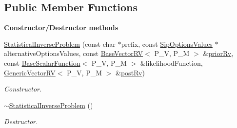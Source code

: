 \subsection*{Public Member Functions}
\begin{Indent}{\bf Constructor/\-Destructor methods}\par
\begin{DoxyCompactItemize}
\item 
\hyperlink{class_q_u_e_s_o_1_1_statistical_inverse_problem_a98ad98a7030b2c6577a0e840506bf74d}{Statistical\-Inverse\-Problem} (const char $\ast$prefix, const \hyperlink{class_q_u_e_s_o_1_1_sip_options_values}{Sip\-Options\-Values} $\ast$alternative\-Options\-Values, const \hyperlink{class_q_u_e_s_o_1_1_base_vector_r_v}{Base\-Vector\-R\-V}$<$ P\-\_\-\-V, P\-\_\-\-M $>$ \&\hyperlink{class_q_u_e_s_o_1_1_statistical_inverse_problem_a954df0672a7c1271eaff53b8d5f3fbc2}{prior\-Rv}, const \hyperlink{class_q_u_e_s_o_1_1_base_scalar_function}{Base\-Scalar\-Function}$<$ P\-\_\-\-V, P\-\_\-\-M $>$ \&likelihood\-Function, \hyperlink{class_q_u_e_s_o_1_1_generic_vector_r_v}{Generic\-Vector\-R\-V}$<$ P\-\_\-\-V, P\-\_\-\-M $>$ \&\hyperlink{class_q_u_e_s_o_1_1_statistical_inverse_problem_a69360a2f2ec5f33b33c5b5f61ec15344}{post\-Rv})
\begin{DoxyCompactList}\small\item\em Constructor. \end{DoxyCompactList}\item 
\hyperlink{class_q_u_e_s_o_1_1_statistical_inverse_problem_a9e63552ba21e18dd6a4748df101decd4}{$\sim$\-Statistical\-Inverse\-Problem} ()
\begin{DoxyCompactList}\small\item\em Destructor. \end{DoxyCompactList}\end{DoxyCompactItemize}
\end{Indent}
